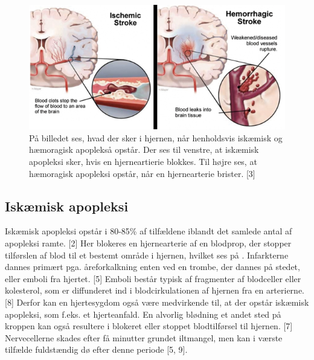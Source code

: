 \begin{figure}[H]
	\centering
	\includegraphics[scale=0.8]{figures/bProblemanalyse/haemoragisk_og_iskaemisk.png}
	\caption{På billedet ses, hvad der sker i hjernen, når henholdsvis iskæmisk og hæmoragisk apoplekså opstår. Der ses til venstre, at iskæmisk apopleksi sker, hvis en hjerneartierie blokkes. Til højre ses, at hæmoragisk apopleksi opstår, når en hjernearterie brister. [3]}
	\label{haem-isk}
\end{figure}

\subsection{Iskæmisk apopleksi}
Iskæmisk apopleksi opstår i 80-85\% af tilfældene iblandt det samlede antal af apopleksi ramte. [2] Her blokeres en hjernearterie af en blodprop, der stopper tilførslen af blod til et bestemt område i hjernen, hvilket ses på . Infarkterne dannes primært pga. åreforkalkning enten ved en trombe, der dannes på stedet, eller emboli fra hjertet. [5] Emboli består typisk af fragmenter af blodceller eller kolesterol, som er diffunderet ind i blodcirkulationen af hjernen fra en arterierne. [8] Derfor kan en hjertesygdom også være medvirkende til, at der opstår iskæmisk apopleksi, som f.eks. et hjerteanfald. En alvorlig blødning et andet sted på kroppen kan også resultere i blokeret eller stoppet blodtilførsel til hjernen. [7] Nervecellerne skades efter få minutter grundet iltmangel, men kan i værste tilfælde fuldstændig dø efter denne periode [5, 9].%

